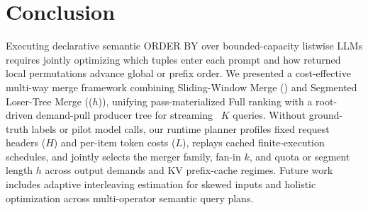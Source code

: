 \section{Conclusion}
\label{sec:conclusion}
Executing declarative semantic \textsf{ORDER BY} over bounded-capacity listwise LLMs requires jointly optimizing which tuples enter each prompt and how returned local permutations advance global or prefix order. We presented a cost-effective multi-way merge framework combining Sliding-Window Merge (\SW) and Segmented Loser-Tree Merge (\LT($h$)), unifying pass-materialized Full ranking with a root-driven demand-pull producer tree for streaming \LIMIT~$K$ queries. Without ground-truth labels or pilot model calls, our runtime planner profiles fixed request headers ($H$) and per-item token costs ($L$), replays cached finite-execution schedules, and jointly selects the merger family, fan-in $k$, and quota or segment length $h$ across output demands and KV prefix-cache regimes. Future work includes adaptive interleaving estimation for skewed inputs and holistic optimization across multi-operator semantic query plans.
